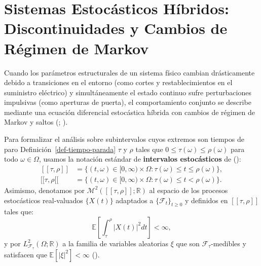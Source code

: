 \documentclass[
  spanish,
  us-letterpaper,
]{scrreprt}
\numberwithin{equation}{section}
\theoremstyle{plain}
\theoremstyle{plain}
\theoremstyle{definition}
\theoremstyle{plain}
\theoremstyle{remark}
\begin{document}
\section{Sistemas Estocásticos Híbridos: Discontinuidades y Cambios de
Régimen de
Markov}\label{sistemas-estocuxe1sticos-huxedbridos-discontinuidades-y-cambios-de-ruxe9gimen-de-markov}

Cuando los parámetros estructurales de un sistema físico cambian
drásticamente debido a transiciones en el entorno (como cortes y
restablecimientos en el suministro eléctrico) y simultáneamente el
estado continuo sufre perturbaciones impulsivas (como aperturas de
puerta), el comportamiento conjunto se describe mediante una ecuación
diferencial estocástica híbrida con cambios de régimen de Markov y
saltos (;
).

Para formalizar el análisis sobre subintervalos cuyos extremos son
tiempos de paro Definición~\ref{def-tiempo-parada} \(\tau\) y \(\rho\)
tales que \(0 \le \tau(\omega) \le \rho(\omega)\) para todo
\(\omega \in \Omega\), usamos la notación estándar de \textbf{intervalos
estocásticos} de (): \[
\begin{aligned}
\left[[\tau,\rho]\right] &= \{(t,\omega)\in[0,\infty)\times\Omega:\tau(\omega)\le t\le\rho(\omega)\}, \\
[[\tau,\rho[[ &= \{(t,\omega)\in[0,\infty)\times\Omega:\tau(\omega)\le t<\rho(\omega)\}.
\end{aligned}
\] Asimismo, denotamos por \(\mathcal{M}^2([[\tau, \rho]]; \mathbb{R})\)
al espacio de los procesos estocásticos real-valuados \(\{X(t)\}\)
adaptados a \(\{\mathcal{F}_t\}_{t \ge 0}\) y definidos en
\([[\tau, \rho]]\) tales que: \[
\mathbb{E}\left[ \displaystyle \int_\tau^\rho \vert X(t) \vert^2 dt\right] < \infty,
\] y por \(L^2_{\mathcal{F}_\tau}(\Omega; \mathbb{R})\) a la familia de
variables aleatorias \(\xi\) que son \(\mathcal{F}_\tau\)-medibles y
satisfacen que \(\mathbb{E}[\vert \xi \vert^2] < \infty\)
().
\end{document}
